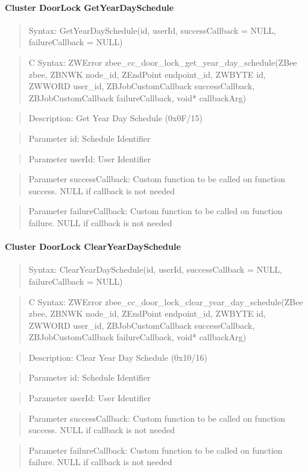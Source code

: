 \paragraph{Cluster DoorLock GetYearDaySchedule}
\begin{quote}Syntax: GetYearDaySchedule(id, userId, successCallback = NULL, failureCallback = NULL)\end{quote}
\begin{quote}C Syntax: ZWError zbee\_cc\_door\_lock\_get\_year\_day\_schedule(ZBee zbee, ZBNWK node\_id, ZEndPoint endpoint\_id, ZWBYTE id, ZWWORD user\_id, ZBJobCustomCallback successCallback, ZBJobCustomCallback failureCallback, void* callbackArg)\end{quote}
\begin{quote}Description: Get Year Day Schedule (0x0F/15)\end{quote}
\begin{quote}Parameter id: Schedule Identifier\end{quote}
\begin{quote}Parameter userId: User Identifier\end{quote}
\begin{quote}Parameter successCallback: Custom function to be called on function success. NULL if callback is not needed\end{quote}
\begin{quote}Parameter failureCallback: Custom function to be called on function failure. NULL if callback is not needed\end{quote}


\paragraph{Cluster DoorLock ClearYearDaySchedule}
\begin{quote}Syntax: ClearYearDaySchedule(id, userId, successCallback = NULL, failureCallback = NULL)\end{quote}
\begin{quote}C Syntax: ZWError zbee\_cc\_door\_lock\_clear\_year\_day\_schedule(ZBee zbee, ZBNWK node\_id, ZEndPoint endpoint\_id, ZWBYTE id, ZWWORD user\_id, ZBJobCustomCallback successCallback, ZBJobCustomCallback failureCallback, void* callbackArg)\end{quote}
\begin{quote}Description: Clear Year Day Schedule (0x10/16)\end{quote}
\begin{quote}Parameter id: Schedule Identifier\end{quote}
\begin{quote}Parameter userId: User Identifier\end{quote}
\begin{quote}Parameter successCallback: Custom function to be called on function success. NULL if callback is not needed\end{quote}
\begin{quote}Parameter failureCallback: Custom function to be called on function failure. NULL if callback is not needed\end{quote}


